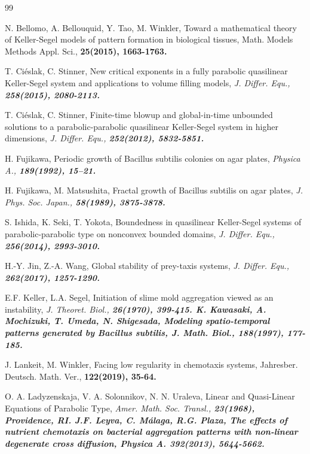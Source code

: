 \documentclass[12pt]{article}
\theoremstyle{plain}
\theoremstyle{definition}
\numberwithin{equation}{section}
\begin{document}
\begin{thebibliography}{99}
\addtolength{\itemsep}{-0.5 em}

N. Bellomo, A. Bellouquid, Y. Tao, M. Winkler, Toward a mathematical theory of Keller-Segel models of pattern formation in biological tissues, Math. Models Methods Appl. Sci., \bf25\rm(2015), 1663-1763.

 T. Ci\'{e}slak, C. Stinner, New critical exponents in a fully parabolic quasilinear Keller-Segel system and applications to volume filling models, \it J. Differ. Equ., \bf258\rm (2015), 2080-2113.

 T. Ci\'{e}slak, C. Stinner, Finite-time blowup and global-in-time unbounded solutions to a parabolic-parabolic quasilinear   Keller-Segel system in higher dimensions, \it J. Differ. Equ., \bf252\rm (2012), 5832-5851.


 H. Fujikawa, Periodic growth of Bacillus subtilis colonies on agar plates, \it Physica A., \bf189\rm(1992), 15--21.

 H. Fujikawa, M. Matsushita, Fractal growth of Bacillus subtilis on agar plates, \it J. Phys. Soc. Japan., \bf58\rm(1989),    3875-3878.

 S. Ishida, K. Seki, T. Yokota, Boundedness in quasilinear Keller-Segel systems of parabolic-parabolic type on nonconvex bounded    domains, \it J. Differ. Equ., \bf 256\rm (2014), 2993-3010.

 H.-Y. Jin, Z.-A. Wang, Global stability of prey-taxis systems,   \it J. Differ. Equ.,  \bf262\rm(2017), 1257-1290.

 E.F. Keller, L.A. Segel, Initiation of slime mold aggregation viewed as an instability, \it J. Theoret. Biol.,
 \bf26\rm(1970),  399-415.
K. Kawasaki, A. Mochizuki, T. Umeda, N. Shigesada, Modeling spatio-temporal patterns generated by Bacillus subtilis, \it J. Math. Biol., \bf188\rm (1997), 177-185.

J. Lankeit, M. Winkler, Facing low regularity in chemotaxis systems, Jahresber. Deutsch. Math. Ver., \bf122\rm(2019), 35-64.

 O. A. Ladyzenskaja, V. A. Solonnikov, N. N. Uraleva,  Linear and Quasi-Linear Equations of Parabolic Type, \it Amer. Math. Soc. Transl., \bf 23\rm(1968), Providence, RI.
 J.F. Leyva, C. M\'{a}laga, R.G. Plaza, The effects of nutrient chemotaxis on bacterial aggregation patterns with non-linear degenerate cross diffusion, \it Physica A. \bf 392\rm(2013), 5644-5662.


\end{thebibliography}
\end{document}
